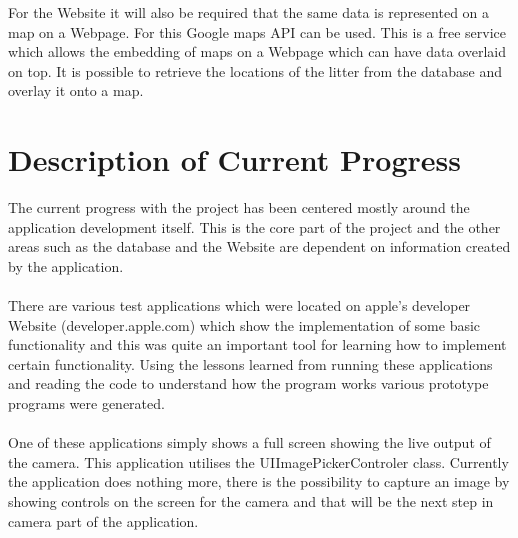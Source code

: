 \documentclass[12pt]{article}
\begin{document}
For the Website  it will also be required that the same data is represented on a map on a Webpage. For this Google maps API can be used. This is a free service which allows the embedding of maps on a Webpage which can have data overlaid on top. It is possible to retrieve the locations of the litter from the database and overlay it onto a map.


\newpage


\label{sec:Objectives}
\section{Description of Current Progress}


The current progress with the project has been centered mostly around the application development itself. This is the core part of the project and the other areas such as the database and the Website are dependent on information created by the application.

\paragraph{}
\label{par:First Paragraph}

There are various test applications which were located on apple's developer Website (developer.apple.com) which show the implementation of some basic functionality and this was quite an important tool for learning how to implement certain functionality.
Using the lessons learned from running these applications and reading the code to understand how the program works various prototype programs were generated. 


\paragraph{}
\label{par:First Paragraph}

One of these applications simply shows a full screen showing the live output of the camera. This application utilises the UIImagePickerControler class. Currently the application does nothing more, there is the possibility to capture an image by showing controls on the screen for the camera and that will be the next step in camera part of the application.
\end{document}
